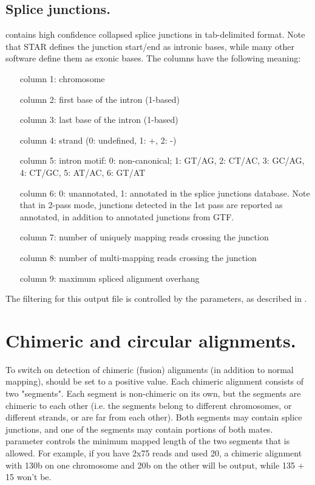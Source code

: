 \documentclass[12pt]{article}
\begin{document}
\subsection{Splice junctions.}
 contains high confidence collapsed splice junctions in tab-delimited format.
Note that STAR defines the junction start/end as intronic bases, while many other software define them as exonic bases.
The columns have the following meaning:
\begin{itemize}[leftmargin=1in]
\item[column 1:] chromosome
\item[column 2:] first base of the intron (1-based)
\item[column 3:] last base of the intron (1-based)
\item[column 4:] strand (0: undefined, 1: +, 2: -)
\item[column 5:] intron motif: 0: non-canonical; 1: GT/AG, 2: CT/AC, 3: GC/AG, 4: CT/GC, 5: AT/AC, 6: GT/AT
\item[column 6:] 0: unannotated, 1: annotated in the splice junctions database. Note that in 2-pass mode, junctions detected in the 1st pass are reported as annotated, in addition to annotated junctions from GTF.
\item[column 7:] number of uniquely mapping reads crossing the junction
\item[column 8:] number of multi-mapping reads crossing the junction
\item[column 9:] maximum spliced alignment overhang
\end{itemize}
The filtering for this output file is controlled by the  parameters, as described in .

\section{Chimeric and circular alignments.}
To switch on detection of chimeric (fusion) alignments (in addition to normal mapping),  should be set to a positive value. Each chimeric alignment consists of two "segments". Each segment is non-chimeric on its own, but the segments are chimeric to each other (i.e. the segments belong to different chromosomes, or different strands, or are far from each other). Both segments may contain splice junctions, and one of the segments may contain portions of both mates.  parameter controls the minimum mapped length of the two segments that is allowed. For example, if you have 2x75 reads and used  20, a chimeric alignment with 130b on one chromosome and 20b on the other will be output, while 135 + 15 won't be.
\end{document}

